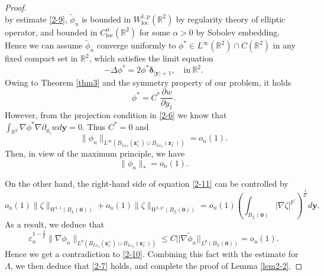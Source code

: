 \documentclass[12pt,reqno]{amsart}
\numberwithin{equation}{section}
\theoremstyle{definition}
\theoremstyle{remark}
\begin{document}
\begin{proof}
\begin{equation*}
	\end{equation*}
	by estimate \eqref{2-9}, $\tilde\phi_n$ is bounded in $W^{1,p}_{\mathrm{loc}}(\mathbb R^2)$ by regularity theory of elliptic operator, and bounded in $C^{\alpha}_{\mathrm{loc}}(\mathbb R^2)$ for some $\alpha>0$ by Sobolev embedding. Hence we can assume $\tilde\phi_n$ converge uniformly to $\phi^*\in L^\infty(\mathbb R^2)\cap C(\mathbb R^2)$ in any fixed compact set in $\mathbb R^2$, which satisfies the limit equation
	\begin{equation*}
	   -\Delta\phi^*=2\phi^*\boldsymbol \delta_{|\boldsymbol y|=1}, \quad \mathrm{in} \ \mathbb R^2.
	\end{equation*}
	Owing to Theorem \ref{thm3} and the symmetry property of our problem, it holds
	\begin{equation*}
		\phi^*=C^*\frac{\partial w}{\partial y_1}.
	\end{equation*}
	However, from the projection condition in \eqref{2-6} we know that $\int_{\mathbb R^2}\nabla\phi^*\nabla \partial_{y_1} wd\boldsymbol y=0$. Thus $C^*=0$ and
	\begin{equation*}
		\|\phi_n\|_{L^\infty(B_{L\varepsilon_n}(\boldsymbol z_1^+)\cup B_{L\varepsilon_n}(\boldsymbol z_1^-))}=o_n(1).
	\end{equation*}
	Then, in view of the maximum principle, we have
	\begin{equation}
		\|\phi_n\|_*=o_n(1).
	\end{equation}
	
	On the other hand, the right-hand side of equation \eqref{2-11} can be controlled by 
	$$o_n(1)\|\zeta\|_{W^{1,1}(B_L(\boldsymbol 0))}+o_n(1)\|\zeta\|_{W^{1,p'}(B_L(\boldsymbol 0))}=o_n(1)\left(\int_{B_L(\boldsymbol 0)}|\nabla\zeta|^{p'}\right)^{\frac{1}{p'}}d\boldsymbol y.$$
    As a result, we deduce that
    \begin{equation*}
    	\varepsilon_n^{1-\frac{2}{p}}\|\nabla\phi_n\|_{L^p(B_{L\varepsilon_n}(\boldsymbol z_1^+)\cup B_{L\varepsilon_n}(\boldsymbol z_1^-))}\le C||\nabla\tilde\phi_n||_{L^p(B_L(\boldsymbol 0))}=o_n(1).
    \end{equation*}
	Hence we get a contradiction to \eqref{2-10}. Combining this fact with the estimate for $\Lambda$, we then deduce that \eqref{2-7} holds, and complete the proof of Lemma \ref{lem2-2}.
\end{proof}
	
\end{document}

